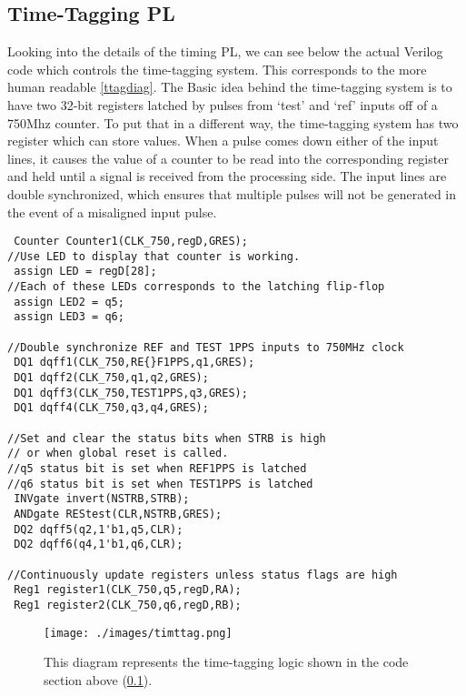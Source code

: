\subsection{Time-Tagging PL}
\label{ttpl}
Looking into the details of the timing PL, we can see below the actual Verilog code which controls the time-tagging system. This corresponds to the more human readable \autoref{ttagdiag}. The Basic idea behind the time-tagging system is to have two 32-bit registers latched by pulses from `test' and `ref' inputs off of a 750Mhz counter. To put that in a different way, the time-tagging system has two register which can store values. When a pulse comes down either of the input lines, it causes the value of a counter to be read into the corresponding register and held until a signal is received from the processing side. The input lines are double synchronized, which ensures that multiple pulses will not be generated in the event of a misaligned input pulse.
\label{ttpl}
\begin{small}
\begin{singlespace}
\begin{verbatim}
 Counter Counter1(CLK_750,regD,GRES);
//Use LED to display that counter is working.
 assign LED = regD[28];
//Each of these LEDs corresponds to the latching flip-flop
 assign LED2 = q5;
 assign LED3 = q6;

//Double synchronize REF and TEST 1PPS inputs to 750MHz clock
 DQ1 dqff1(CLK_750,RE{}F1PPS,q1,GRES);
 DQ1 dqff2(CLK_750,q1,q2,GRES);
 DQ1 dqff3(CLK_750,TEST1PPS,q3,GRES);
 DQ1 dqff4(CLK_750,q3,q4,GRES);

//Set and clear the status bits when STRB is high
// or when global reset is called.
//q5 status bit is set when REF1PPS is latched
//q6 status bit is set when TEST1PPS is latched
 INVgate invert(NSTRB,STRB);
 ANDgate REStest(CLR,NSTRB,GRES);
 DQ2 dqff5(q2,1'b1,q5,CLR);
 DQ2 dqff6(q4,1'b1,q6,CLR);

//Continuously update registers unless status flags are high
 Reg1 register1(CLK_750,q5,regD,RA);
 Reg1 register2(CLK_750,q6,regD,RB);
\end{verbatim}
\end{singlespace}
\end{small}

\begin{figure}[H]
\centering
\texttt{[image: ./images/timttag.png]}
\caption[TIM Time-Tagging PL]{This diagram represents the time-tagging logic shown in the code section above (\ref{ttpl}).}
\label{ttagdiag}
\end{figure}

